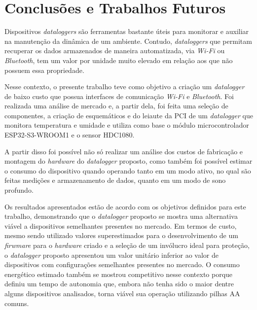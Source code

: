 \chapter{Conclusões e Trabalhos Futuros}
\label{chap:conclusoes-e-trabalhos-futuros}

Dispositivos \textit{dataloggers} são ferramentas bastante úteis para monitorar e auxiliar na manutenção da dinâmica de um ambiente. Contudo, \textit{dataloggers} que permitam recuperar os dados armazenados de maneira automatizada, via \textit{Wi-Fi} ou \textit{Bluetooth}, tem um valor por unidade muito elevado em relação aos que não possuem essa propriedade.

Nesse contexto, o presente trabalho teve como objetivo a criação um \textit{datalogger} de baixo custo que possua interfaces de comunicação \textit{Wi-Fi} e \textit{Bluetooth}. Foi realizada uma análise de mercado e, a partir dela, foi feita uma seleção de componentes, a criação de esquemáticos e do leiaute da \gls{PCI} de um \textit{datalogger} que monitora temperatura e umidade e utiliza como base o módulo microcontrolador ESP32-S3-WROOM1 e o sensor HDC1080.

A partir disso foi possível não só realizar um análise dos custos de fabricação e montagem do \textit{hardware} do \textit{datalogger} proposto, como também foi possível estimar o consumo do dispositivo quando operando tanto em um modo ativo, no qual são feitas medições e armazenamento de dados, quanto em um modo de sono profundo.

Os resultados apresentados estão de acordo com os objetivos definidos para este trabalho, demonstrando que o \textit{datalogger} proposto se mostra uma alternativa viável a dispositivos semelhantes presentes no mercado. Em termos de custo, mesmo sendo utilizado valores superestimados para o desenvolvimento de um \textit{firwmare} para o \textit{hardware} criado e a seleção de um invólucro ideal para proteção, o \textit{datalogger} proposto apresentou um valor unitário inferior ao valor de dispositivos com configurações semelhantes presentes no mercado. O consumo energético estimado também se mostrou competitivo nesse contexto porque definiu um tempo de autonomia que, embora não tenha sido o maior dentre alguns dispositivos analisados, torna viável sua operação utilizando pilhas AA comuns.

